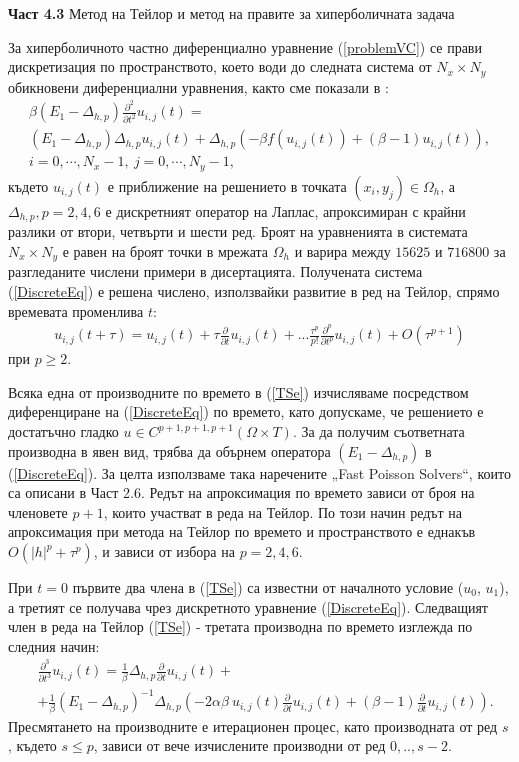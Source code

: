 \documentclass[a5paper]{article}
\newcommand{\rf}[1]{(\ref{#1})}
\theoremstyle{remark}
\begin{document}
\begin{large}
\textbf{Част 4.3} Метод на Тейлор и метод на правите за хиперболичната задача

За хиперболичното частно диференциално уравнение \rf{problemVC} се прави дискретизация по пространството, което води до следната система от $N_x \times N_y$ обикновени диференциални уравнения, както сме показали в \cite{refHyp}:
\begin{align} \label{DiscreteEq}
\beta (E_1-\Delta_{h,p}) \frac{\partial^2 }{\partial t^2}u_{i, j}(t)= \nonumber \\
 (E_1 - \Delta_{h,p})\Delta_{h,p} u_{i, j}(t) + \Delta_{h,p} ( -\beta f( u_{i, j}(t) ) + (\beta-1) u_{i, j}(t) ), \nonumber \\
i = 0,\cdots, N_x-1, \: j = 0 ,\cdots , N_y-1,
\end{align}
където $u_{i,j}(t)$ е приближение на решението в точката $(x_i, y_j) \in \Omega_h$, а $\Delta_{h,p}, p=2,4,6$ е дискретният оператор на Лаплас, апроксимиран с крайни разлики от втори, четвърти и шести ред.
Броят на уравненията в системата $N_x \times N_y$ е равен на броят точки в мрежата $\Omega_h$ и варира между $15 625$ и $716 800$ за разгледаните числени примери в дисертацията. Получената система \rf{DiscreteEq} е решена числено, използвайки развитие в ред на Тейлор, спрямо времевата променлива $t$:
\begin{align} \label{TSe}
u_{i, j}(t+\tau) = u_{i, j}(t) + \tau \frac{ \partial }{ \partial t }u_{i, j}(t)  + ... 
\frac{ \tau^p }{ p! } \frac{ \partial^p}{ \partial t^p }u_{i, j}(t) + O(\tau^{p+1})
\end{align}
при $p \ge 2$. 

Всяка една от производните по времето в \rf{TSe} изчисляваме посредством диференциране на \rf{DiscreteEq} по времето, като допускаме, че решението е достатъчно гладко $u \in C^{p+1,p+1,p+1}(\Omega \times T)$. За да получим съответната производна в явен вид, трябва да обърнем оператора $(E_1-\Delta_{h,p})$ в \rf{DiscreteEq}. За целта използваме така наречените „Fast Poisson Solvers“, които са описани в Част 2.6. Редът на апроксимация по времето зависи от броя на членовете $p+1$, които участват в реда на Тейлор. По този начин редът на апроксимация при метода на Тейлор по времето и пространството е еднакъв $O(|h|^p + \tau^p)$, и зависи от избора на $p=2,4,6$.

При $t=0$ първите два члена в \rf{TSe} са известни от началното условие ($u_0$, $u_1$), а третият се получава чрез дискретното уравнение \rf{DiscreteEq}.  Следващият член в реда на Тейлор \rf{TSe} - третата производна по времето изглежда по следния начин:
\begin{align*} \label{der3}
 &\frac{\partial^3}{\partial t^3}u_{i,j}(t) = \frac{1}{\beta}\Delta_{h,p} \frac{\partial}{\partial t}u_{i, j}(t) + \nonumber\\
&+ \frac{1}{\beta} (E_1-\Delta_{h,p})^{-1}\Delta_{h,p} \left( -2 \alpha \beta \: u_{i, j}(t) \frac{\partial}{\partial t}u_{i, j}(t) +  (\beta-1) \frac{\partial}{\partial t} u_{i, j}(t) \right).
\end{align*}
Пресмятането на производните е итерационен процес, като производната от ред $s$, където $s \le p$, зависи от вече изчислените производни от ред $0,..,s-2.$ \\


\end{large}
\end{document}

